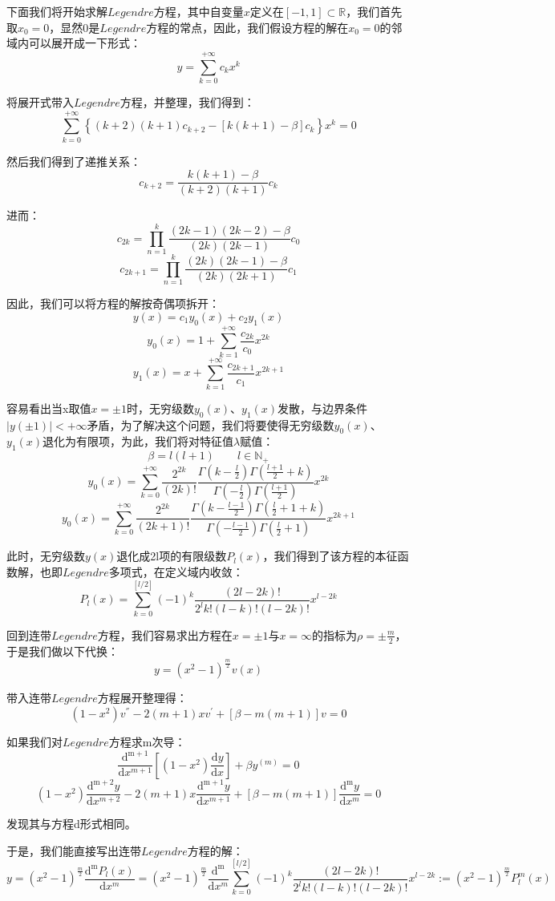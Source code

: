 下面我们将开始求解$Legendre$方程，其中自变量$x$定义在$[-1,1] \subset \mathbb{R}$，我们首先取$x_0=0$，显然0是$Legendre$方程的常点，因此，我们假设方程的解在$x_0=0$的邻域内可以展开成一下形式：
\[y=\sum_{k=0}^{+\infty}c_kx^k\]

将展开式带入$Legendre$方程，并整理，我们得到：
\[\sum_{k=0}^{+\infty} \left \{ (k+2)(k+1)c_{k+2}-[k(k+1)-\beta]c_k \right \}x^k=0\]

然后我们得到了递推关系：
\[c_{k+2}=\frac{k(k+1)-\beta}{(k+2)(k+1)}c_k\]

进而：
\[c_{2k}=\prod_{n=1}^{k}\frac{(2k-1)(2k-2)-\beta}{(2k)(2k-1)}c_0\]
\[c_{2k+1}=\prod_{n=1}^{k}\frac{(2k)(2k-1)-\beta}{(2k)(2k+1)}c_1\]

因此，我们可以将方程的解按奇偶项拆开：
\[y(x)=c_1y_0(x)+c_2y_1(x)\]
\[y_0(x)=1+\sum_{k=1}^{+\infty}\frac{c_{2k}}{c_0}x^{2k}\]
\[y_1(x)=x+\sum_{k=1}^{+\infty}\frac{c_{2k+1}}{c_1}x^{2k+1}\]

容易看出当x取值$x= \pm 1$时，无穷级数$y_0(x)$、$y_1(x)$发散，与边界条件$|y(\pm 1)|< +\infty$矛盾，为了解决这个问题，我们将要使得无穷级数$y_0(x)$、$y_1(x)$退化为有限项，为此，我们将对特征值$\lambda$赋值：
\[\beta=l(l+1) \qquad l \in \mathbb{N}_{+}\]
\[y_0(x)=\sum_{k=0}^{+\infty}\frac{2^{2k}}{(2k)!}\frac{\Gamma(k-\frac{l}{2})\Gamma(\frac{l+1}{2}+k)}{\Gamma(-\frac{l}{2})\Gamma(\frac{l+1}{2})}x^{2k}\]
\[y_0(x)=\sum_{k=0}^{+\infty}\frac{2^{2k}}{(2k+1)!}\frac{\Gamma(k-\frac{l-1}{2})\Gamma(\frac{l}{2}+1+k)}{\Gamma(-\frac{l-1}{2})\Gamma(\frac{l}{2}+1)}x^{2k+1}\]

此时，无穷级数$y(x)$退化成2l项的有限级数$P_l(x)$，我们得到了该方程的本征函数解，也即$Legendre$多项式，在定义域内收敛：
\[P_l(x)=\sum_{k=0}^{[l/2]}(-1)^k \frac{(2l-2k)!}{2^l k! (l-k)!(l-2k)!}x^{l-2k}\]

回到连带$Legendre$方程，我们容易求出方程在$x= \pm 1$与$x=\infty$的指标为$\rho= \pm \frac{m}{2}$，于是我们做以下代换：
\[y=(x^2-1)^{\frac{m}{2}}v(x)\]

带入连带$Legendre$方程展开整理得：
\[(1-x^2)v^{''}-2(m+1)xv^{'}+[\beta-m(m+1)]v=0 \tag{d}\]

如果我们对$Legendre$方程求m次导：
\[\frac{\mathrm{d^{m+1}}}{\mathrm{d}{x^{m+1}}} \left [(1-x^2) \frac{\mathrm{d} y}{\mathrm{d}{x}} \right ]+\beta y^{(m)}=0\]
\[(1-x^2)\frac{\mathrm{d^{m+2}}y}{\mathrm{d}{x^{m+2}}}-2(m+1)x\frac{\mathrm{d^{m+1}}y}{\mathrm{d}{x^{m+1}}}+[\beta-m(m+1)]\frac{\mathrm{d^{m}}y}{\mathrm{d}{x^{m}}}=0\]

发现其与方程d形式相同。

于是，我们能直接写出连带$Legendre$方程的解：
\[y=(x^2-1)^{\frac{m}{2}}\frac{\mathrm{d^{m}}P_l(x)}{\mathrm{d}{x^{m}}}=(x^2-1)^{\frac{m}{2}}\frac{\mathrm{d^{m}}}{\mathrm{d}{x^{m}}}\sum_{k=0}^{[l/2]}(-1)^k \frac{(2l-2k)!}{2^l k! (l-k)!(l-2k)!}x^{l-2k}:=(x^2-1)^{\frac{m}{2}}P^m_l(x)\]

